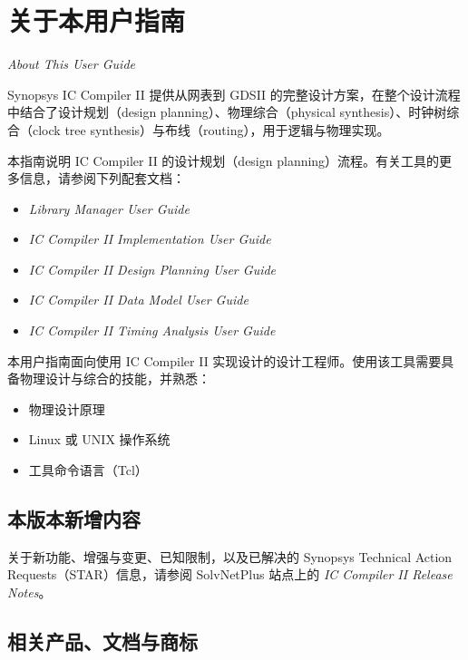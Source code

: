 \chapter*{关于本用户指南}

\noindent\textit{About This User Guide}

Synopsys IC Compiler II 提供从网表到 GDSII 的完整设计方案，在整个设计流程中结合了设计规划（design planning）、物理综合（physical synthesis）、时钟树综合（clock tree synthesis）与布线（routing），用于逻辑与物理实现。

本指南说明 IC Compiler II 的设计规划（design planning）流程。有关工具的更多信息，请参阅下列配套文档：
\begin{itemize}
  \item \textit{Library Manager User Guide}
  \item \textit{IC Compiler II Implementation User Guide}
  \item \textit{IC Compiler II Design Planning User Guide}
  \item \textit{IC Compiler II Data Model User Guide}
  \item \textit{IC Compiler II Timing Analysis User Guide}
\end{itemize}

本用户指南面向使用 IC Compiler II 实现设计的设计工程师。使用该工具需要具备物理设计与综合的技能，并熟悉：
\begin{itemize}
  \item 物理设计原理
  \item Linux 或 UNIX 操作系统
  \item 工具命令语言（Tcl）
\end{itemize}

\section*{本版本新增内容}

关于新功能、增强与变更、已知限制，以及已解决的 Synopsys Technical Action Requests（STAR）信息，请参阅 SolvNetPlus 站点上的 \textit{IC Compiler II Release Notes}。

\section*{相关产品、文档与商标}

